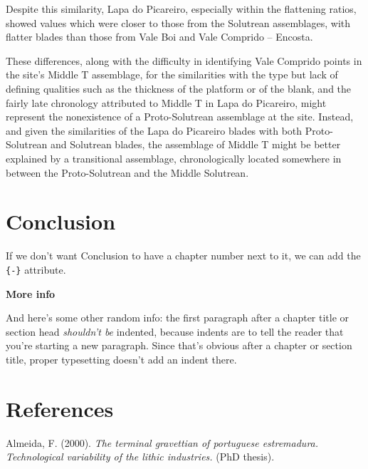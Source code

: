 \documentclass[12pt,twoside]{reedthesis}
\begin{document}
Despite this similarity, Lapa do Picareiro, especially within the flattening ratios, showed values which were closer to those from the Solutrean assemblages, with flatter blades than those from Vale Boi and Vale Comprido -- Encosta.

These differences, along with the difficulty in identifying Vale Comprido points in the site's Middle T assemblage, for the similarities with the type but lack of defining qualities such as the thickness of the platform or of the blank, and the fairly late chronology attributed to Middle T in Lapa do Picareiro, might represent the nonexistence of a Proto-Solutrean assemblage at the site. Instead, and given the similarities of the Lapa do Picareiro blades with both Proto-Solutrean and Solutrean blades, the assemblage of Middle T might be better explained by a transitional assemblage, chronologically located somewhere in between the Proto-Solutrean and the Middle Solutrean.

\hypertarget{conclusion}{%
\chapter*{Conclusion}\label{conclusion}}

If we don't want Conclusion to have a chapter number next to it, we can add the \texttt{\{-\}} attribute.

\textbf{More info}

And here's some other random info: the first paragraph after a chapter title or section head \emph{shouldn't be} indented, because indents are to tell the reader that you're starting a new paragraph. Since that's obvious after a chapter or section title, proper typesetting doesn't add an indent there.

\hypertarget{references}{%
\chapter*{References}\label{references}}


\noindent

\setlength{\parindent}{-0.20in}
\setlength{\leftskip}{0.20in}
\setlength{\parskip}{8pt}

\hypertarget{refs}{}
\leavevmode\hypertarget{ref-almeida2000}{}%
Almeida, F. (2000). \emph{The terminal gravettian of portuguese estremadura. Technological variability of the lithic industries.} (PhD thesis).
\end{document}
